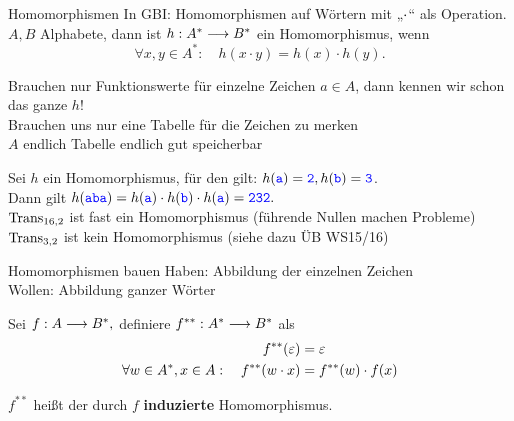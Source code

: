 \begin{frame}{Homomorphismen}
	In GBI: Homomorphismen auf Wörtern mit „$\cdot$“ als Operation.\\
	\impl $A, B$ Alphabete, dann ist $h: A^* \longrightarrow B^*$ ein Homomorphismus, wenn
	$$ \forall x, y \in A^* : \quad h(x \cdot y) = h(x) \cdot h(y). $$
	
	\pause
	\impl Brauchen nur Funktionswerte für einzelne Zeichen $a \in A$, dann kennen wir schon das ganze $h$! \\
	\impl Brauchen uns nur eine Tabelle für die Zeichen zu merken \\
	\impl $A$ endlich \impl Tabelle endlich \impl gut speicherbar
	
	\pause
	\begin{Beispiel}
		Sei $h$ ein Homomorphismus, für den gilt: $h(\hbox{\textcolor{blue}{\texttt{a}}}) = \hbox{\textcolor{blue}{\texttt{2}}}, h(\hbox{\textcolor{blue}{\texttt{b}}}) = \hbox{\textcolor{blue}{\texttt{3}}}$. \\
		Dann gilt $h(\hbox{\textcolor{blue}{\texttt{aba}}}) = h(\hbox{\textcolor{blue}{\texttt{a}}}) \cdot h(\hbox{\textcolor{blue}{\texttt{b}}}) \cdot h(\hbox{\textcolor{blue}{\texttt{a}}}) = \hbox{\textcolor{blue}{\texttt{232}}}. $ \\[0.5em]
		\pause
		$\text{Trans}_{16,2}$ ist fast ein Homomorphismus (führende Nullen machen Probleme)\\
		$\text{Trans}_{3,2}$ ist kein Homomorphismus (siehe dazu ÜB WS15/16)
	\end{Beispiel}
\end{frame}

\begin{frame}{Homomorphismen bauen}
	Haben: Abbildung der einzelnen Zeichen \\
	Wollen: Abbildung ganzer Wörter 
	\begin{Definition}
		Sei $f: A \longrightarrow B^*,$ \pause definiere $f^{**}:A^* \longrightarrow B^*$ als
		\begin{align*}
		f^{**}(\varepsilon) &= \varepsilon  \\
		\forall w\in A^*, x\in A: \quad  f^{**}(w \cdot x) &= f^{**}(w) \cdot f(x)       
		\end{align*}
	\end{Definition}

	$f^{**}$ heißt der durch $f$ \textbf{induzierte} Homomorphismus.
\end{frame}

